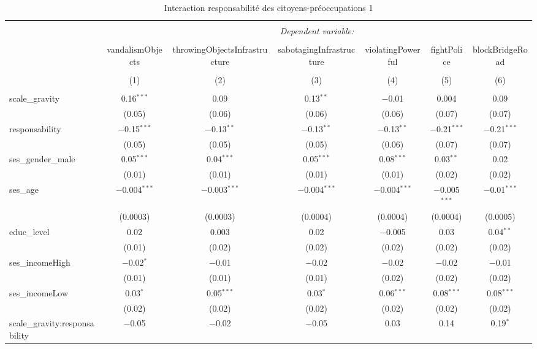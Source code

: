 \documentclass[
]{article}
\begin{document}
\begin{sidewaystable}[!htbp] \centering 
  \caption{Interaction responsabilité des citoyens-préoccupations 1} 
  \label{} 
\begin{tabular}{@{\extracolsep{1pt}}lcccccc} 
\\[-1.8ex]\hline 
\hline \\[-1.8ex] 
 & \multicolumn{6}{c}{\textit{Dependent variable:}} \\ 
\cline{2-7} 
\\[-1.8ex] & vandalismObjects & throwingObjectsInfrastructure & sabotagingInfrastructure & violatingPowerful & fightPolice & blockBridgeRoad \\ 
\\[-1.8ex] & (1) & (2) & (3) & (4) & (5) & (6)\\ 
\hline \\[-1.8ex] 
 scale\_gravity & 0.16$^{***}$ & 0.09 & 0.13$^{**}$ & $-$0.01 & 0.004 & 0.09 \\ 
  & (0.05) & (0.06) & (0.06) & (0.06) & (0.07) & (0.07) \\ 
  responsability & $-$0.15$^{***}$ & $-$0.13$^{**}$ & $-$0.13$^{**}$ & $-$0.13$^{**}$ & $-$0.21$^{***}$ & $-$0.21$^{***}$ \\ 
  & (0.05) & (0.05) & (0.05) & (0.06) & (0.07) & (0.07) \\ 
  ses\_gender\_male & 0.05$^{***}$ & 0.04$^{***}$ & 0.05$^{***}$ & 0.08$^{***}$ & 0.03$^{**}$ & 0.02 \\ 
  & (0.01) & (0.01) & (0.01) & (0.01) & (0.02) & (0.02) \\ 
  ses\_age & $-$0.004$^{***}$ & $-$0.003$^{***}$ & $-$0.004$^{***}$ & $-$0.004$^{***}$ & $-$0.005$^{***}$ & $-$0.01$^{***}$ \\ 
  & (0.0003) & (0.0003) & (0.0004) & (0.0004) & (0.0004) & (0.0005) \\ 
  educ\_level & 0.02 & 0.003 & 0.02 & $-$0.005 & 0.03 & 0.04$^{**}$ \\ 
  & (0.01) & (0.02) & (0.02) & (0.02) & (0.02) & (0.02) \\ 
  ses\_incomeHigh & $-$0.02$^{*}$ & $-$0.01 & $-$0.02 & $-$0.02 & $-$0.02 & $-$0.01 \\ 
  & (0.01) & (0.01) & (0.01) & (0.02) & (0.02) & (0.02) \\ 
  ses\_incomeLow & 0.03$^{*}$ & 0.05$^{***}$ & 0.03$^{*}$ & 0.06$^{***}$ & 0.08$^{***}$ & 0.08$^{***}$ \\ 
  & (0.02) & (0.02) & (0.02) & (0.02) & (0.02) & (0.02) \\ 
  scale\_gravity:responsability & $-$0.05 & $-$0.02 & $-$0.05 & 0.03 & 0.14 & 0.19$^{*}$ \\ 

\end{tabular}
\end{sidewaystable}
\end{document}
